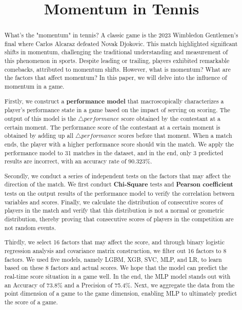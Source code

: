 \documentclass{mcmthesis}
\title{Momentum in Tennis}
\begin{document}
\begin{abstract}
\par What's the "momentum" in tennis? A classic game is the 2023 Wimbledon Gentlemen’s final where Carlos Alcaraz defeated Novak Djokovic. This match highlighted significant shifts in momentum, challenging the traditional understanding and measurement of this phenomenon in sports. Despite leading or trailing, players exhibited remarkable comebacks, attributed to momentum shifts. However, what is momentum? What are the factors that affect momentum? In this paper, we will delve into the influence of momentum in a game.

Firstly, we construct a \textbf{performance model} that macroscopically characterizes a player's performance state in a game based on the impact of serving on scoring. The output of this model is the $\bigtriangleup performance$ score obtained by the contestant at a certain moment. The performance score of the contestant at a certain moment is obtained by adding up all $\bigtriangleup performance$ scores before that moment. When a match ends, the player with a higher performance score should win the match. We apply the performance model to 31 matches in the dataset, and in the end, only 3 predicted results are incorrect, with an accuracy rate of 90.323\%. 

Secondly, we conduct a series of independent tests on the factors that may affect the direction of the match. We first conduct \textbf{Chi-Square} tests and \textbf{Pearson coefficient} tests on the output results of the performance model to verify the correlation between variables and scores. Finally, we calculate the distribution of consecutive scores of players in the match and verify that this distribution is not a normal or geometric distribution, thereby proving that consecutive scores of players in the competition are not random events.

Thirdly, we select 16 factors that may affect the score, and through binary logistic regression analysis and covariance matrix construction, we filter out 16 factors to 8 factors. We used five models, namely LGBM, XGB, SVC, MLP, and LR, to learn based on these 8 factors and actual scores. We hope that the model can predict the real-time score situation in a game well. In the end, the MLP model stands out with an Accuracy of 73.8\% and a Precision of 75.4\%. Next, we aggregate the data from the point dimension of a game to the game dimension, enabling MLP to ultimately predict the score of a game.


\end{abstract}
\end{document}
